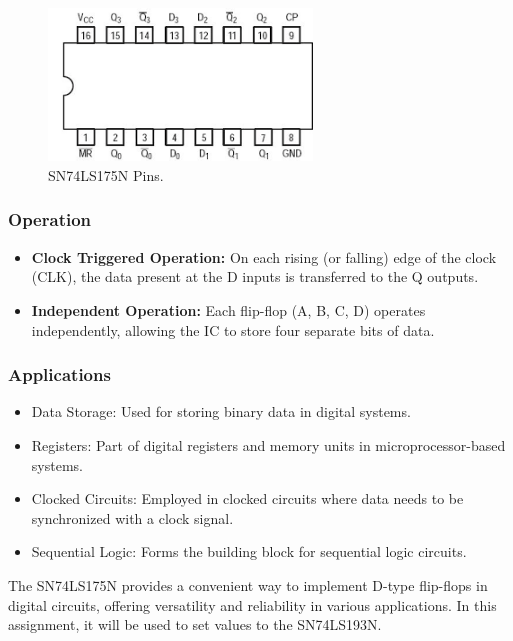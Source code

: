 \documentclass{article}
\begin{document}
\begin{figure}[h]
    \centering
    \includegraphics[width=7cm]{Pic/Pictures/175N.png}
    \caption{SN74LS175N Pins.}
    \label{fig:enter-label}
\end{figure}

\subsubsection{Operation}
\begin{itemize}
    \item \textbf{Clock Triggered Operation:} On each rising (or falling) edge of the clock (CLK), the data present at the D inputs is transferred to the Q outputs.
    \item \textbf{Independent Operation:} Each flip-flop (A, B, C, D) operates independently, allowing the IC to store four separate bits of data.
\end{itemize}

\subsubsection{Applications}
\begin{itemize}
    \item Data Storage: Used for storing binary data in digital systems.
    \item Registers: Part of digital registers and memory units in microprocessor-based systems.
    \item Clocked Circuits: Employed in clocked circuits where data needs to be synchronized with a clock signal.
    \item Sequential Logic: Forms the building block for sequential logic circuits.
\end{itemize}

The SN74LS175N provides a convenient way to implement D-type flip-flops in digital circuits, offering versatility and reliability in various applications. In this assignment, it will be used to set values to the SN74LS193N.\par
\end{document}
